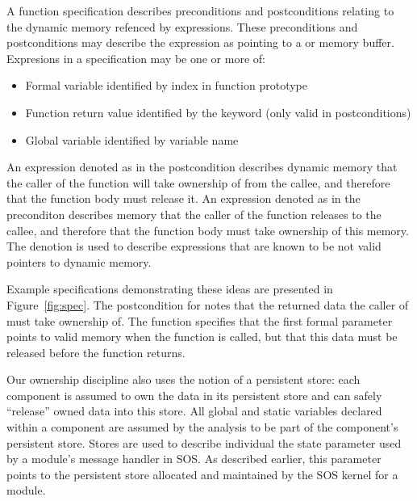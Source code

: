 A function specification describes preconditions and postconditions relating
to the dynamic memory refenced by expressions.
%
These preconditions and postconditions may describe the expression as
pointing to a  or  memory buffer.
%
Expresions in a specification may be one or more of: 
%
\begin{itemize}
%
\item Formal variable identified by index in function prototype
%
\item Function return value identified by the keyword  (only
valid in postconditions)
%
\item Global variable identified by variable name
%
\end{itemize}
%
An expression denoted as  in the postcondition describes dynamic
memory that the caller of the function will take ownership of from the
callee, and therefore that the function body must release it.
%
An expression denoted as  in the preconditon describes memory
that the caller of the function releases to the callee, and therefore that
the function body must take ownership of this memory.
%
The  denotion is used to describe expressions that are known to
be not valid pointers to dynamic memory.



Example specifications demonstrating these ideas are presented in 
Figure~\ref{fig:spec}.
%
The postcondition for  notes that the returned data the
caller of  must take ownership of.
%
The  function specifies that the first formal parameter
points to valid memory when the function is called, but that this data must
be released before the function returns.



%
Our ownership discipline also uses the notion of a persistent store:  each
component is assumed to own the data in its persistent store and can safely
``release'' owned data into this store.
%
All global and static variables declared within a component are assumed by
the analysis to be part of the component's persistent store.
%
Stores are used to describe individual the state parameter used by a
module's message handler in SOS.
%
As described earlier, this parameter points to the persistent store
allocated and maintained by the SOS kernel for a module.



